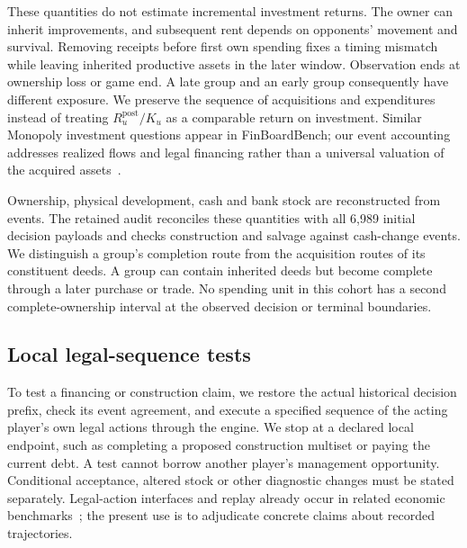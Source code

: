 These quantities do not estimate incremental investment returns. The owner can inherit improvements, and subsequent rent depends on opponents' movement and survival. Removing receipts before first own spending fixes a timing mismatch while leaving inherited productive assets in the later window. Observation ends at ownership loss or game end. A late group and an early group consequently have different exposure. We preserve the sequence of acquisitions and expenditures instead of treating $R_u^{\mathrm{post}}/K_u$ as a comparable return on investment. Similar Monopoly investment questions appear in FinBoardBench; our event accounting addresses realized flows and legal financing rather than a universal valuation of the acquired assets~\cite{hu2026finboardbench}.

Ownership, physical development, cash and bank stock are reconstructed from events. The retained audit reconciles these quantities with all 6,989 initial decision payloads and checks construction and salvage against cash-change events. We distinguish a group's completion route from the acquisition routes of its constituent deeds. A group can contain inherited deeds but become complete through a later purchase or trade. No spending unit in this cohort has a second complete-ownership interval at the observed decision or terminal boundaries.

\subsection{Local legal-sequence tests}

To test a financing or construction claim, we restore the actual historical decision prefix, check its event agreement, and execute a specified sequence of the acting player's own legal actions through the engine. We stop at a declared local endpoint, such as completing a proposed construction multiset or paying the current debt. A test cannot borrow another player's management opportunity. Conditional acceptance, altered stock or other diagnostic changes must be stated separately. Legal-action interfaces and replay already occur in related economic benchmarks~\cite{wu2026agentmonopoly,zhang2026dece}; the present use is to adjudicate concrete claims about recorded trajectories.

